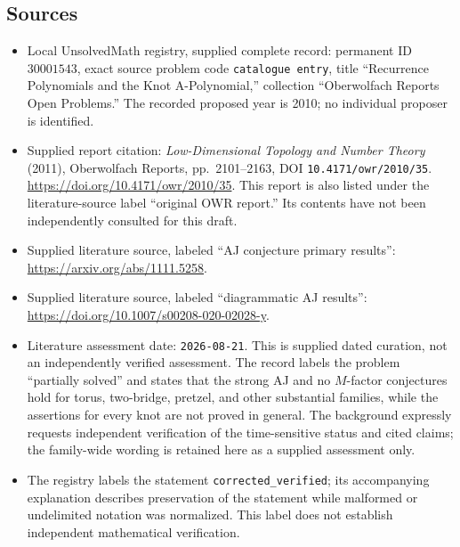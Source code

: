 \documentclass[11pt]{article}
\begin{document}
\subsection{Sources}
\begin{itemize}
\item Local UnsolvedMath registry, supplied complete record: permanent ID \(30001543\), exact source problem code \texttt{catalogue entry}, title ``Recurrence Polynomials and the Knot A-Polynomial,'' collection ``Oberwolfach Reports Open Problems.'' The recorded proposed year is 2010; no individual proposer is identified.
\item Supplied report citation: \emph{Low-Dimensional Topology and Number Theory} (2011), Oberwolfach Reports, pp.\ 2101--2163, DOI \texttt{10.4171/owr/2010/35}. \url{https://doi.org/10.4171/owr/2010/35}. This report is also listed under the literature-source label ``original OWR report.'' Its contents have not been independently consulted for this draft.
\item Supplied literature source, labeled ``AJ conjecture primary results'': \url{https://arxiv.org/abs/1111.5258}.
\item Supplied literature source, labeled ``diagrammatic AJ results'': \url{https://doi.org/10.1007/s00208-020-02028-y}.
\item Literature assessment date: \texttt{2026-08-21}. This is supplied dated curation, not an independently verified assessment. The record labels the problem ``partially solved'' and states that the strong AJ and no \(M\)-factor conjectures hold for torus, two-bridge, pretzel, and other substantial families, while the assertions for every knot are not proved in general. The background expressly requests independent verification of the time-sensitive status and cited claims; the family-wide wording is retained here as a supplied assessment only.
\item The registry labels the statement \texttt{corrected\_verified}; its accompanying explanation describes preservation of the statement while malformed or undelimited notation was normalized. This label does not establish independent mathematical verification.
\end{itemize}
\end{document}
